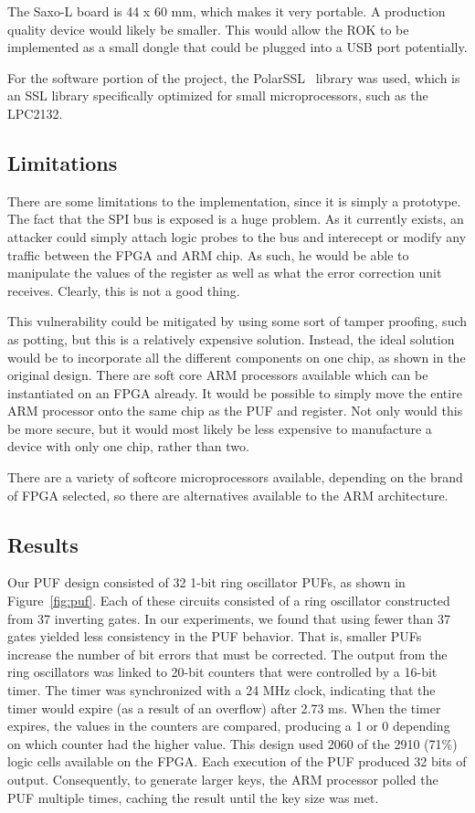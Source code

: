 The Saxo-L board is 44 x 60 mm, which makes it very portable. A production quality device would likely be smaller.
This would allow the ROK to be implemented as a small dongle that could be plugged into a USB port potentially.

For the software portion of the project, the PolarSSL~\cite{polarssl} library was used, which is an SSL library
specifically optimized for small microprocessors, such as the LPC2132.

\subsection{Limitations}
There are some limitations to the implementation, since it is simply a prototype. The fact that the SPI bus is exposed
is a huge problem. As it currently exists, an attacker could simply attach logic probes to the bus and interecept or
modify any traffic between the FPGA and ARM chip. As such, he would be able to manipulate the values of the register
as well as what the error correction unit receives. Clearly, this is not a good thing.

This vulnerability could be mitigated by using some sort of tamper proofing, such as potting, but this is a relatively
expensive solution. Instead, the ideal solution would be to incorporate all the different components on one chip, as
shown in the original design. There are soft core ARM processors available which can be instantiated on an FPGA
already. It would be possible to simply move the entire ARM processor onto the same chip as the PUF and register.
Not only would this be more secure, but it would most likely be less expensive to manufacture a device with only
one chip, rather than two.

There are a variety of softcore microprocessors available, depending on the brand of FPGA selected, so there are
alternatives available to the ARM architecture.

\subsection{Results}
Our PUF design consisted of 32 1-bit ring oscillator PUFs, as shown in Figure~\ref{fig:puf}.
Each of these circuits consisted of a ring oscillator constructed from 37 inverting gates.
In our experiments, we found that using fewer than 37 gates yielded less consistency in the
PUF behavior.  That is, smaller PUFs increase the number of bit errors that must be corrected.
The output from the ring oscillators was linked to 20-bit
counters that were controlled by a 16-bit timer.  The timer was synchronized with a 24 MHz
clock, indicating that the timer would expire (as a result of an overflow) after 2.73 ms.
When the timer expires, the values in the counters are compared, producing a 1 or 0 depending
on which counter had the higher value.
This design used 2060 of the 2910 (71\%) logic cells available on the FPGA.  Each execution
of the PUF produced 32 bits of output.  Consequently, to generate larger keys, the ARM processor
polled the PUF multiple times, caching the result until the key size was met.

